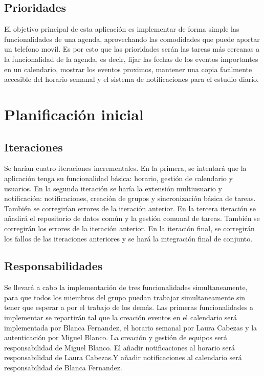 \documentclass[a4paper,openright,12pt]{article}
\begin{document}
\subsection{Prioridades}
El objetivo principal de esta aplicación es implementar de forma simple las funcionalidades de una agenda, aprovechando las comodidades que puede aportar un telefono movil. Es por esto que las prioridades serán las tareas más cercanas a la funcionalidad de la agenda, es decir, fijar las fechas de los eventos importantes en un calendario, mostrar los eventos proximos, mantener una copia facilmente accesible del horario semanal y el sistema de notificaciones para el estudio diario. 



\section{Planificación inicial}

\subsection{Iteraciones}
Se harían cuatro iteraciones incrementales. En la primera, se intentará que la aplicación tenga su funcionalidad básica: horario, gestión de calendario y usuarios.
En la segunda iteración se haría la extensión multiusuario y notificación: notificaciones, creación de grupos y sincronización básica de tareas. También se corregirían errores de la iteración anterior.
En la tercera iteración se añadirá el repositorio de datos común y la gestión comunal de tareas. También se corregirán los errores de la iteración anterior.
En la iteración final, se corregirán los fallos de las iteraciones anteriores y se hará la integración final de conjunto.

\subsection{Responsabilidades}
Se llevará a cabo la implementación de tres funcionalidades simultaneamente, para que todos los miembros del grupo puedan trabajar simultaneamente sin tener que esperar a por el trabajo de los demás. Las primeras funcionalidades a implementar se repartirán tal que 
la creación eventos en el calendario será implementada por Blanca Fernandez, el horario semanal por Laura Cabezas y la autenticación por Miguel Blanco. 
\newline
La creación y gestión de equipos será responsabilidad de Miguel Blanco. El añadir notificaciones al horario será responsabilidad de Laura Cabezas.Y añadir notificaciones al calendario será responsabilidad de Blanca Fernandez.
\end{document}

